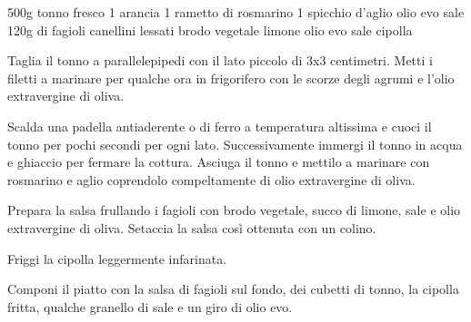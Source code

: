 \begin{ingreds}
	500g tonno fresco
	1 arancia
	1 rametto di rosmarino
	1 spicchio d'aglio
	olio evo 
	sale
\columnbreak
{}
	120g di fagioli canellini lessati
	brodo vegetale
	limone
	olio evo
	sale
	cipolla
\end{ingreds}

\begin{method}

Taglia il tonno a parallelepipedi con il lato piccolo di 3x3 centimetri. Metti i filetti a marinare per qualche ora in frigorifero con le scorze degli agrumi e l'olio extravergine di oliva.

Scalda una padella antiaderente o di ferro a temperatura altissima e cuoci il tonno per pochi secondi per ogni lato. Successivamente immergi il tonno in acqua e ghiaccio per fermare la cottura. Asciuga il tonno e mettilo a marinare con rosmarino e aglio coprendolo compeltamente di olio extravergine di oliva.

Prepara la salsa frullando i fagioli con brodo vegetale, succo di limone, sale e olio extravergine di oliva. Setaccia la salsa così ottenuta con un colino.

Friggi la cipolla leggermente infarinata.

Componi il piatto con la salsa di fagioli sul fondo, dei cubetti di tonno, la cipolla fritta, qualche granello di sale e un giro di olio evo.
\end {method}
